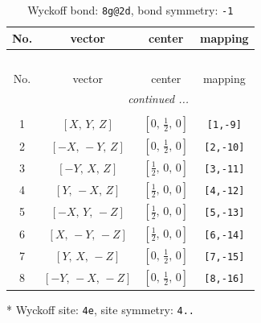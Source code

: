 \documentclass[fleqn,8pt]{jsarticle}
\begin{document}
\renewcommand{\arraystretch}{1.2}
\begin{longtable}{cccc}
\caption{Wyckoff bond: {\tt 8g@2d}, bond symmetry: {\tt -1}}
 \\
 \hline \hline
No. & vector & center & mapping \\ \hline \endfirsthead

\multicolumn{3}{l}{\tablename\ \thetable{}} \\
 \hline \hline
No. & vector & center & mapping \\ \hline \endhead

 \hline \hline
\multicolumn{3}{r}{\footnotesize\it continued ...} \\ \endfoot

 \hline \hline
\multicolumn{3}{r}{} \\ \endlastfoot

1 & $\left[ X,\, Y,\, Z \right]$ & $\left[ 0,\, \frac{1}{2},\, 0 \right]$ & {\tt [1,-9]} \\ \hline
2 & $\left[ - X,\, - Y,\, Z \right]$ & $\left[ 0,\, \frac{1}{2},\, 0 \right]$ & {\tt [2,-10]} \\ \hline
3 & $\left[ - Y,\, X,\, Z \right]$ & $\left[ \frac{1}{2},\, 0,\, 0 \right]$ & {\tt [3,-11]} \\ \hline
4 & $\left[ Y,\, - X,\, Z \right]$ & $\left[ \frac{1}{2},\, 0,\, 0 \right]$ & {\tt [4,-12]} \\ \hline
5 & $\left[ - X,\, Y,\, - Z \right]$ & $\left[ \frac{1}{2},\, 0,\, 0 \right]$ & {\tt [5,-13]} \\ \hline
6 & $\left[ X,\, - Y,\, - Z \right]$ & $\left[ \frac{1}{2},\, 0,\, 0 \right]$ & {\tt [6,-14]} \\ \hline
7 & $\left[ Y,\, X,\, - Z \right]$ & $\left[ 0,\, \frac{1}{2},\, 0 \right]$ & {\tt [7,-15]} \\ \hline
8 & $\left[ - Y,\, - X,\, - Z \right]$ & $\left[ 0,\, \frac{1}{2},\, 0 \right]$ & {\tt [8,-16]} \\
\end{longtable}
* Wyckoff site: {\tt 4e}, site symmetry: {\tt 4..}
\renewcommand{\arraystretch}{1.2}
\end{document}
